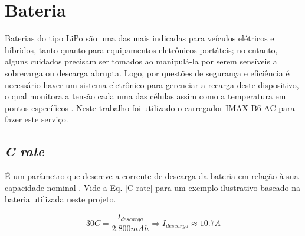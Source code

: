 \section{Bateria} %
Baterias do tipo LiPo são uma das mais indicadas para veículos elétricos e híbridos, tanto quanto para equipamentos eletrônicos portáteis; no 
entanto, alguns cuidados precisam ser tomados ao manipulá-la por serem sensíveis a sobrecarga ou descarga abrupta.
Logo, por questões de segurança e eficiência é necessário haver um sistema eletrônico para gerenciar a recarga deste dispositivo, o qual monitora a 
tensão cada uma das células assim como a temperatura em pontos específicos \cite{battery}.
Neste trabalho foi utilizado o carregador IMAX B6-AC para fazer este serviço.
\subsection{\textit{C rate}}
É um parâmetro que descreve a corrente de descarga da bateria em relação à sua capacidade nominal \cite{bateria}.
Vide a Eq. \ref{C rate} para um exemplo ilustrativo baseado na bateria utilizada neste projeto.

\begin{equation}
 \label{C rate}
 30 C = \frac{ I_{descarga} }{ 2.800 mAh} \Rightarrow I_{descarga} \approx 10.7A
\end{equation}
